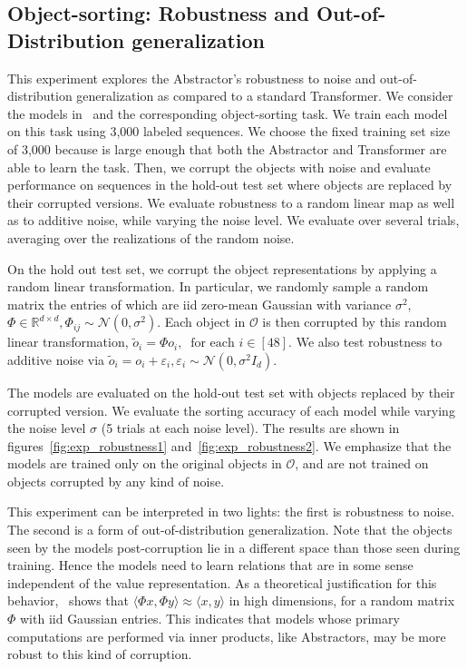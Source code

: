\subsection{Object-sorting: Robustness and Out-of-Distribution generalization}

This experiment explores the Abstractor's robustness to noise and out-of-distribution generalization as compared to a standard Transformer. We consider the models in~ and the corresponding object-sorting task. We train each model on this task using 3,000 labeled sequences. We choose the fixed training set size of 3,000 because is large enough that both the Abstractor and Transformer are able to learn the task. Then, we corrupt the objects with noise and evaluate performance on sequences in the hold-out test set where objects are replaced by their corrupted versions. We evaluate robustness to a random linear map as well as to additive noise, while varying the noise level. We evaluate over several trials, averaging over the realizations of the random noise.

On the hold out test set, we corrupt the object representations by applying a random linear transformation. In particular, we randomly sample a random matrix the entries of which are iid zero-mean Gaussian with variance $\sigma^2$, $\Phi \in \mathbb{R}^{d \times d}, \Phi_{ij} \sim \mathcal{N}(0, \sigma^2)$. Each object in $\mathcal{O}$ is then corrupted by this random linear transformation, $\tilde{o}_i = \Phi o_i, \ \text{ for each } i \in [48]$. We also test robustness to additive noise via $\tilde{o}_i = o_i + \varepsilon_i, \varepsilon_i \sim \mathcal{N}(0, \sigma^2 I_d)$.

The models are evaluated on the hold-out test set with objects replaced by their corrupted version. We evaluate the sorting accuracy of each model while varying the noise level $\sigma$ (5 trials at each noise level). The results are shown in figures~\ref{fig:exp_robustness1} and~\ref{fig:exp_robustness2}. We emphasize that the models are trained only on the original objects in $\mathcal{O}$, and are not trained on objects corrupted by any kind of noise.

This experiment can be interpreted in two lights: the first is robustness to noise. The second is a form of out-of-distribution generalization. Note that the objects seen by the models post-corruption lie in a different space than those seen during training. Hence the models need to learn relations that are in some sense independent of the value representation. As a theoretical justification for this behavior,~\cite{zhouCompressedPrivacySensitive2009} shows that $\langle \Phi x, \Phi y \rangle \approx \langle x, y \rangle$ in high dimensions, for a random matrix $\Phi$ with iid Gaussian entries. This indicates that models whose primary computations are performed via inner products, like Abstractors, may be more robust to this kind of corruption.

